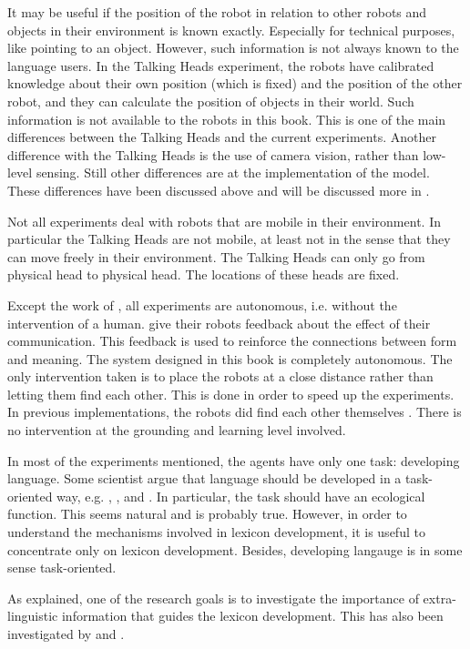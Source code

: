 It may be useful if the position of the robot in relation to other robots and objects in their environment is known exactly. Especially for technical purposes, like pointing to an object. However, such information is not always known to the language users. In the Talking Heads experiment, the robots have calibrated knowledge about their own position (which is fixed) and the position of the other robot, and they can calculate the position of objects in their world. Such information is not available to the robots in this book. This is one of the main differences between the Talking Heads and the current experiments. Another difference with the Talking Heads is the use of camera vision, rather than low-level sensing. Still other differences are at the implementation of the model. These differences have been discussed above and will be discussed more in .

Not all experiments deal with robots that are mobile in their environment. In particular the Talking Heads are not mobile, at least not in the sense that they can move freely in their environment. The Talking Heads can only go from physical head to physical head. The locations of these heads are fixed. 

Except the work of \citet{yancostein}, all experiments are autonomous, i.e. without the intervention of a human. \citeauthor{yancostein} give their robots feedback about the effect of their communication. This feedback is used to reinforce the connections between form and meaning. The system designed in this book is completely autonomous. The only intervention taken is to place the robots at a close distance rather than letting them find each other. This is done in order to speed up the experiments. In previous implementations, the robots did find each other themselves \citep{steelsvogt:1997}. There is no intervention at the grounding and learning level involved.

In most of the experiments mentioned, the agents have only one task: developing language. Some scientist argue that language should be developed in a task-oriented way, e.g. \citet{billard:1997a}, \citet{cangelosiparisi:1998}, \citet{dejong:2000} and \citet{yancostein}. In particular, the task should have an ecological function. This seems natural and is probably true. However, in order to understand the mechanisms involved in lexicon development, it is useful to concentrate only on lexicon development. Besides, developing langauge is in some sense task-oriented.

As explained, one of the research goals is to investigate the importance of extra-linguistic information that guides the lexicon development. This has also been investigated by \citet{oliphant:1997} and \citet{dejong:2000}.

